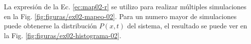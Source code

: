 \documentclass[twocolumn,aps,prl]{revtex4-1}
\begin{document}
La expresión de la Ec. \ref{ec:map02-r} se utilizo para realizar múltiples simulaciones en la Fig. \ref{fig:figuras/ex02-mapeo-02}. Para un numero mayor de simulaciones puede obtenerse la distribución $P(x,t)$ del sistema, el resultado se puede ver en la Fig. \ref{fig:figuras/ex02-histograma-02}.


\end{document}
